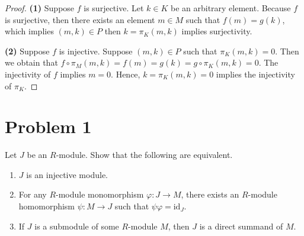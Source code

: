\documentclass[12pt, a4paper]{article}
\theoremstyle{remark}
\begin{document}
\begin{proof}
\textbf{(1)} Suppose $f$ is surjective. Let $k \in K$ be an arbitrary element.
Because $f$ is surjective, then there exists an element $m\in M$ such that $f(m)=g(k)$, which implies $(m,k)\in P$ then $k=\pi_{K}(m,k)$ implies surjectivity.


\textbf{(2)} Suppose $f$ is injective. Suppose $(m,k)\in P$ such that $\pi_K(m,k)=0$. 
 Then we obtain that $f\circ \pi_M(m,k) = f(m) =g(k)= g\circ \pi_K(m,k) = 0$. The injectivity of $f$ implies $m=0$. Hence, $k=\pi_{K}(m,k)=0$ implies the injectivity of $\pi_K$.
\end{proof}

\section*{Problem 1}
Let $J$ be an $R$-module. Show that the following are equivalent.
\begin{enumerate}
    \item[(1)] $J$ is an injective module.
    \item[(2)] For any $R$-module monomorphism $\varphi : J \to M$, there exists an $R$-module homomorphism $\psi : M \to J$ such that $\psi\varphi = \mathrm{id}_J$.
    \item[(3)] If $J$ is a submodule of some $R$-module $M$, then $J$ is a direct summand of $M$.
\end{enumerate}
\end{document}
